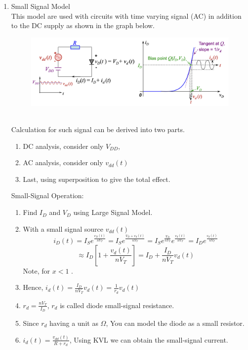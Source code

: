 \documentclass{article}
\begin{document}
\begin{enumerate}
\begin{enumerate}
    \end{enumerate}
    \newpage
    \item Small Signal Model \\
    This model are used with circuits with time varying signal (AC) in addition to the DC supply as shown in the graph below.
    \begin{figure}[h]
        \centering
        \includegraphics[width=1\linewidth]{image/smallsignalmodel.png}
    \end{figure}\\
    Calculation for such signal can be derived into two parts.
    \begin{enumerate}
        \item DC analysis, consider only $V_{DD}$, 
        \item AC analysis, consider only $v_{dd}(t)$
        \item Last, using superposition to give the total effect.
    \end{enumerate}
    Small-Signal Operation:
    \begin{enumerate}
        \item Find $I_D$ and $V_D$ using Large Signal Model.
        \item With a small signal source $v_{dd}(t)$
        \[i_D(t) = I_S e^{\frac{v_D(t)}{nV_T}} = I_S e^{\frac{V_D + v_d(t)}{nV_T}} = I_S e^{\frac{V_D}{nV_T}} e^{\frac{v_d(t)}{nV_T}} = I_D e^{\frac{v_d(t)}{nV_T}}\]
        \[\approx I_D[1+\frac{v_d(t)}{nV_T}] = I_D + \frac{I_D}{nV_T}v_d(t)\]
        Note, {\color{red}{\(e^x \approx 1 + x\)}} for $x < 1$ .
        \item Hence, $\displaystyle i_d(t) = \frac{I_D}{nV_T}v_d(t) = \frac{1}{r_d}v_d(t)$
        \item \(r_d = \frac{nV_T}{I_D}\), $r_d$ is called diode small-signal resistance.
        \item Since $r_d$ having a unit as $\Omega$, You can model the diode as a small resistor.
        \item \(i_d(t) = \frac{v_{dd}(t)}{R+r_d}\), Using KVL we can obtain the small-signal current.

\end{enumerate}
\end{enumerate}
\end{document}
